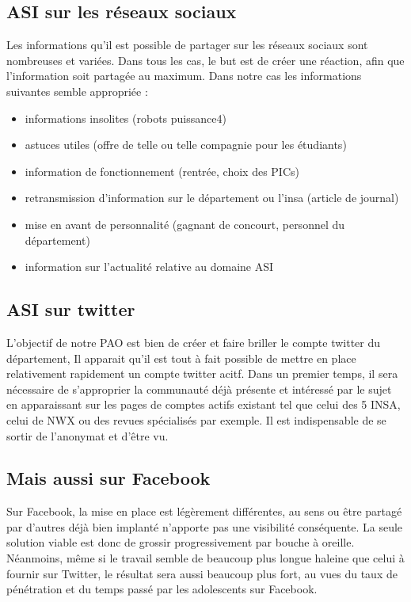 \subsection{ASI sur les réseaux sociaux}
Les informations qu'il est possible de partager sur les réseaux sociaux sont nombreuses et variées. Dans tous les cas, le but est de créer une réaction, afin que l'information soit partagée au maximum. Dans notre cas les informations suivantes semble appropriée :
\begin{itemize}
	\item informations insolites (robots puissance4)
	\item astuces utiles (offre de telle ou telle compagnie pour les étudiants)
	\item information de fonctionnement (rentrée, choix des PICs)
	\item retransmission d'information sur le département ou l'insa (article de journal)
	\item mise en avant de personnalité (gagnant de concourt, personnel du département)
	\item information sur l'actualité relative au domaine ASI
\end{itemize}


\subsection{ASI sur twitter}
L'objectif de notre PAO est bien de créer et faire briller le compte twitter du département, Il apparait qu'il est tout à fait possible de mettre en place relativement rapidement un compte twitter acitf.
Dans un premier temps, il sera nécessaire de s'approprier la communauté déjà présente et intéressé par le sujet en apparaissant sur les pages de comptes actifs existant tel que celui des 5 INSA, celui de NWX ou des revues spécialisés par exemple.
Il est indispensable de se sortir de l'anonymat et d'être vu.

\subsection{Mais aussi sur Facebook}
Sur Facebook, la mise en place est légèrement différentes, au sens ou être partagé par d'autres déjà bien implanté n'apporte pas une visibilité conséquente. La seule solution viable est donc de grossir progressivement par bouche à oreille. Néanmoins, même si le travail semble de beaucoup plus longue haleine que celui à fournir sur Twitter, le résultat sera aussi beaucoup plus fort, au vues du taux de pénétration et du temps passé par les adolescents sur Facebook.